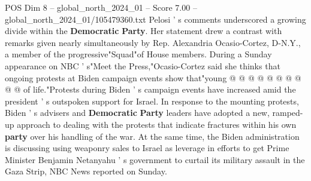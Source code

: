 \begin{textsample}{POS Dim 8 – global\_north\_2024\_01 – Score 7.00 – global\_north\_2024\_01/105479360.txt}
Pelosi ' s comments underscored a growing divide within the \textbf{Democratic} \textbf{Party}.
Her statement drew a contrast with remarks given nearly simultaneously by Rep.
Alexandria Ocasio-Cortez, D-N.Y., a member of the progressive"Squad"of House members.
During a Sunday appearance on NBC ' s"Meet the Press,"Ocasio-Cortez said she thinks that ongoing protests at Biden campaign events show that"young @ @ @ @ @ @ @ @ @ @ of life."Protests during Biden ' s campaign events have increased amid the president ' s outspoken support for Israel.
In response to the mounting protests, Biden ' s advisers and \textbf{Democratic} \textbf{Party} leaders have adopted a new, ramped-up approach to dealing with the protests that indicate fractures within his own \textbf{party} over his handling of the war.
At the same time, the Biden administration is discussing using weaponry sales to Israel as leverage in efforts to get Prime Minister Benjamin Netanyahu ' s government to curtail its military assault in the Gaza Strip, NBC News reported on Sunday.

\end{textsample}
